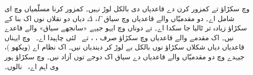 \documentclass[../../../include/open-logic-section]{subfiles}
\begin{document}
 وچ سکڑاؤ تے کمزور کرن دے قاعدیاں دی بالکل لوڑ نہیں۔ کمزور کرنا مسلّمیاں وچ ای شامل اے۔ دو مقدمیّاں والے قاعدیاں وچ سیاق $\Gamma$، $\Delta$ دیاں دو نقلاں نوں اک بنا کے سکڑاؤ زیادہ تر ٹالیا جا سکدا اے۔  تے  دوناں وچ ایہو جیہے «سانجھے سیاق» والے قاعدے نیں۔ اک مقدمے والے قاعدیاں وچ سکڑاؤ صرف \RightR{\lor}، \LeftR{\land}، \RightR{\lexists} تے~\LeftR{\lforall} لئی چاہیدا اے۔~ وچ ایہناں قاعدیاں دیاں شکلاں سکڑاؤ نوں بالکل بے لوڑ کر دیندیاں نیں۔ اک نظام  اے (ویکھو )، جیہدے وچ دو مقدمیّاں والے قاعدیاں دے سیاق اک دوجے توں آزاد نیں۔  وچ سکڑاؤ ہور وی اہم اے،~ نالوں۔


\end{document}
